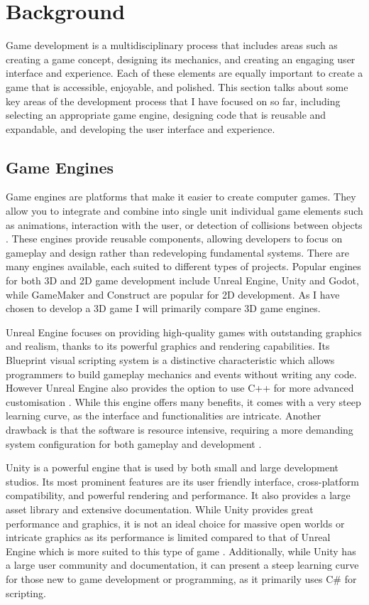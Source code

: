 \documentclass[]{final_report}
\begin{document}
\chapter{Background}
Game development is a multidisciplinary process that includes areas such as creating a game concept, designing its mechanics, and creating an engaging user interface and experience. Each of these elements are equally important to create a game that is accessible, enjoyable, and polished. This section talks about some key areas of the development process that I have focused on so far, including selecting an appropriate game engine, designing code that is reusable and expandable, and developing the user interface and experience.
\section{Game Engines}
Game engines are platforms that make it easier to create computer games. They allow you to integrate and combine into single unit individual game elements such as animations, interaction with the user, or detection of collisions between objects \cite{Barczak2019}. These engines provide reusable components, allowing developers to focus on gameplay and design rather than redeveloping fundamental systems. There are many engines available, each suited to different types of projects. Popular engines for both 3D and 2D game development include Unreal Engine, Unity and Godot, while GameMaker and Construct are popular for 2D development. As I have chosen to develop a 3D game I will primarily compare 3D game engines.\newline

Unreal Engine focuses on providing high-quality games with outstanding graphics and realism, thanks to its powerful graphics and rendering capabilities. Its Blueprint visual scripting system is a distinctive characteristic which allows programmers to build gameplay mechanics and events without writing any code. However Unreal Engine also provides the option to use C++ for more advanced customisation \cite{eventyr_2023}. While this engine offers many benefits, it comes with a very steep learning curve, as the interface and functionalities are intricate. Another drawback is that the software is resource intensive, requiring a more demanding system configuration for both gameplay and development \cite{eventyr_2023}. \newline

Unity is a powerful engine that is used by both small and large development studios. Its most prominent features are its user friendly interface, cross-platform compatibility, and powerful rendering and performance. It also provides a large asset library and extensive documentation. While Unity provides great performance and graphics, it is not an ideal choice for massive open worlds or intricate graphics as its performance is limited compared to that of Unreal Engine which is more suited to this type of game \cite{medium_2024}. Additionally, while Unity has a large user community and documentation, it can present a steep learning curve for those new to game development or programming, as it primarily uses C\# for scripting.\newline
\end{document}

